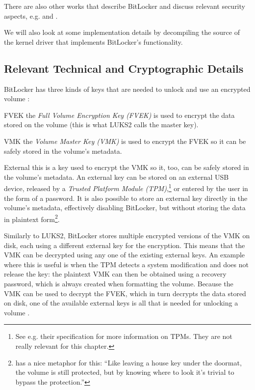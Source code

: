 There are also other works that describe BitLocker and discuss relevant security aspects, e.g. \cite{Tuerpe2009} and \cite{Tan2020}.

We will also look at some implementation details by decompiling the source of the kernel driver that implements BitLocker's functionality.

\subsection{Relevant Technical and Cryptographic Details}
\label{chap:otherapproaches.bitlocker.details}
BitLocker has three kinds of keys that are needed to unlock and use an encrypted volume \cite{Kornblum2009}:
\begin{descitemize}
	\item[FVEK] the \emph{Full Volume Encryption Key (FVEK)} is used to encrypt the data stored on the volume (this is what LUKS2 calls the master key).
	\item[VMK] the \emph{Volume Master Key (VMK)} is used to encrypt the FVEK so it can be safely stored in the volume's metadata.
	\item[External] this is a key used to encrypt the VMK so it, too, can be safely stored in the volume's metadata. An external key can be stored on an external USB device, released by a \emph{Trusted Platform Module (TPM)},\footnote{\label{fn:otherapproaches.bitlocker.tpm} See e.g. their specification \cite{Tpm2019} for more information on TPMs. They are not really relevant for this chapter.} or entered by the user in the form of a password. It is also possible to store an external key directly in the volume's metadata, effectively disabling BitLocker, but without storing the data in plaintext form\footnote{\label{fn:otherapproaches.bitlocker.doormat} \cite{Kornblum2009} has a nice metaphor for this: ``Like leaving a house key under the doormat, the volume is still protected, but by knowing where to look it's trivial to bypass the protection.''}.
\end{descitemize}

Similarly to LUKS2, BitLocker stores multiple encrypted versions of the VMK on disk, each using a different external key for the encryption. This means that the VMK can be decrypted using any one of the existing external keys. An example where this is useful is when the TPM detects a system modification and does not release the key: the plaintext VMK can then be obtained using a recovery password, which is always created when formatting the volume. Because the VMK can be used to decrypt the FVEK, which in turn decrypts the data stored on disk, one of the available external keys is all that is needed for unlocking a volume \cite{Kornblum2009}.

